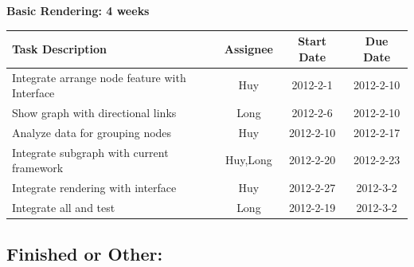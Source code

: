 \documentclass[12pt, letterpaper]{article}
\begin{document}
  \begin{center}
		{\bf Basic Rendering: 4 weeks}
    \begin{tabular}{| p{8.3cm} || c | c | c | }
      \hline
      Task Description & Assignee & Start Date & Due Date \\
      \hline
	    Integrate arrange node feature with Interface & Huy & 2012-2-1 & 2012-2-10 \\
            Show graph with directional links & Long & 2012-2-6 &  2012-2-10 \\
            Analyze data for grouping nodes & Huy & 2012-2-10 & 2012-2-17 \\
            Integrate subgraph with current framework & Huy,Long & 2012-2-20 & 2012-2-23 \\
            Integrate rendering with interface  & Huy & 2012-2-27 & 2012-3-2 \\  
            Integrate all and test  & Long & 2012-2-19 & 2012-3-2 \\
      \hline
    \end{tabular}
  \end{center}


	\subsection{Finished or Other:}
\end{document}
